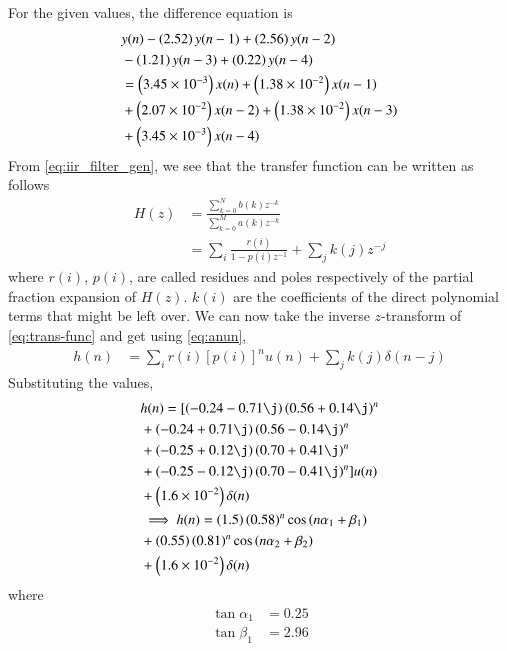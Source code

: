 \documentclass[journal,12pt,twocolumn]{IEEEtran}
\renewcommand\thesection{\arabic{section}}
\begin{document}
\begin{enumerate}[label=\thesection.\arabic*]
\solution
For the given values, the difference equation is
\begin{align}
&y(n) - \left(2.52\right)y(n - 1) + \left(2.56\right)y(n - 2) \nonumber \\
&- \left(1.21\right)y(n - 3) + \left(0.22\right)y(n - 4) \nonumber \\
&= \left(3.45 \times 10^{-3}\right)x(n) + \left(1.38 \times 10^{-2}\right)x(n - 1) \nonumber \\
&+ \left(2.07 \times 10^{-2}\right)x(n - 2) + \left(1.38 \times 10^{-2}\right)x(n - 3) \nonumber \\
&+ \left(3.45 \times 10^{-3}\right)x(n - 4)
\end{align}
From \eqref{eq:iir_filter_gen}, we see that the transfer function can be written as follows
\begin{align}
H(z) &= \frac{\sum_{k = 0}^{N}b(k)z^{-k}}{\sum_{k = 0}^{M}a(k)z^{-k}} \\
&= \sum_{i}\frac{r(i)}{1 - p(i)z^{-1}} + \sum_{j}k(j)z^{-j}
\label{eq:trans-func}
\end{align}
where $r(i)$, $p(i)$, are called residues and poles respectively of the partial 
fraction expansion of $H(z)$. $k(i)$ are the coefficients of the direct polynomial 
terms that might be left over. We can now take the inverse $z$-transform of
\eqref{eq:trans-func} and get using \eqref{eq:anun},
\begin{align}
h(n) &= \sum_{i}r(i)[p(i)]^nu(n) + \sum_{j}k(j)\delta(n - j)
\label{eq:h-n-expr}
\end{align}
Substituting the values,
\begin{align}
&h(n) = [\brak{-0.24-0.71\j}\brak{0.56+0.14\j}^n \nonumber \\
&+ \brak{-0.24+0.71\j}\brak{0.56-0.14\j}^n \nonumber \\
&+ \brak{-0.25+0.12\j}\brak{0.70+0.41\j}^n \nonumber \\
&+ \brak{-0.25-0.12\j}\brak{0.70-0.41\j}^n]u(n) \nonumber \\
&+ \brak{1.6 \times 10^{-2}}\delta(n) \\
&\implies h(n) = \brak{1.5}\brak{0.58}^n\cos\brak{n\alpha_1 + \beta_1} \nonumber \\
&+ \brak{0.55}\brak{0.81}^n\cos\brak{n\alpha_2 + \beta_2} \nonumber \\
&+ \brak{1.6 \times 10^{-2}}\delta(n)
\label{eq:h-n-real}
\end{align}
where
\begin{align}
\tan{\alpha_1} &= 0.25 \\
\tan{\beta_1} &= 2.96 \\

\end{align}
\end{enumerate}
\end{document}
